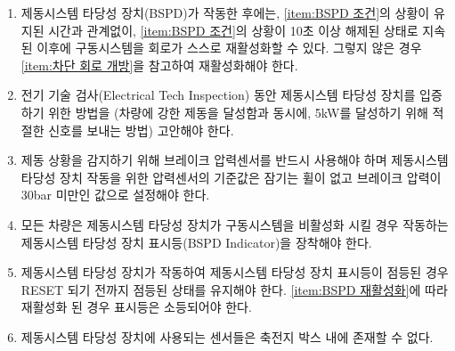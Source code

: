 \documentclass[final,a4paper,10pt]{report}
\begin{document}
\begin{enumerate}
  \item\label{rule:formula-technical.brake-system-plausibility-device.reactivate-after-10s-clear} {\color{blue}제동시스템 타당성 장치(BSPD)가 작동한 후에는, \ref{item:BSPD 조건}의 상황이 유지된 시간과 관계없이, \ref{item:BSPD 조건}의 상황이 10초 이상 해제된 상태로 지속된 이후에 구동시스템을 회로가 스스로 재활성화할 수 있다. 그렇지 않은 경우 \ref{item:차단 회로 개방}을 참고하여 재활성화해야 한다.} \label{item:BSPD 재활성화}
  \item\label{rule:formula-technical.brake-system-plausibility-device.inspection-demonstration-method} 전기 기술 검사(Electrical Tech Inspection) 동안 제동시스템 타당성 장치를 입증하기 위한 방법을 (차량에 강한 제동을 달성함과 동시에, 5kW를 달성하기 위해 적절한 신호를 보내는 방법) 고안해야 한다.
  \item\label{rule:formula-technical.brake-system-plausibility-device.pressure-sensor-threshold-30bar} 제동 상황을 감지하기 위해 브레이크 압력센서를 반드시 사용해야 하며 제동시스템 타당성 장치 작동을 위한 압력센서의 기준값은 잠기는 휠이 없고 브레이크 압력이 30bar 미만인 값으로 설정해야 한다.
  \item\label{rule:formula-technical.brake-system-plausibility-device.bspd-indicator-light} 모든 차량은 제동시스템 타당성 장치가 구동시스템을 비활성화 시킬 경우 작동하는 제동시스템 타당성 장치 표시등(BSPD Indicator)을 장착해야 한다.
  \item\label{rule:formula-technical.brake-system-plausibility-device.indicator-latched-until-reset} 제동시스템 타당성 장치가 작동하여 제동시스템 타당성 장치 표시등이 점등된 경우 RESET 되기 전까지 점등된 상태를 유지해야 한다. {\color{blue}\ref{item:BSPD 재활성화}에 따라 재활성화 된 경우 표시등은 소등되어야 한다.}
  \item\label{rule:formula-technical.brake-system-plausibility-device.sensors-not-in-accumulator} 제동시스템 타당성 장치에 사용되는 센서들은 축전지 박스 내에 존재할 수 없다.
\end{enumerate}
\end{document}
